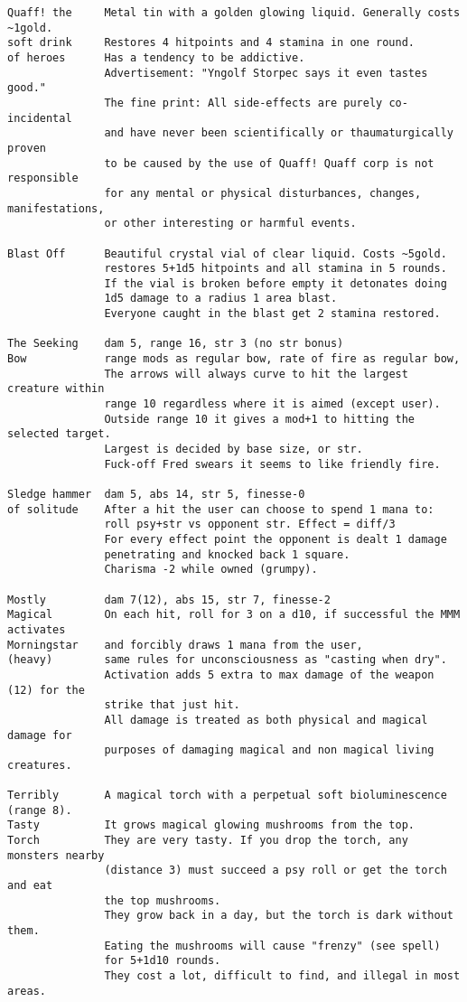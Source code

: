 \small \begin{verbatim}
Quaff! the     Metal tin with a golden glowing liquid. Generally costs ~1gold.
soft drink     Restores 4 hitpoints and 4 stamina in one round.
of heroes      Has a tendency to be addictive.
               Advertisement: "Yngolf Storpec says it even tastes good."
               The fine print: All side-effects are purely co-incidental
               and have never been scientifically or thaumaturgically proven
               to be caused by the use of Quaff! Quaff corp is not responsible
               for any mental or physical disturbances, changes, manifestations,
               or other interesting or harmful events.

Blast Off      Beautiful crystal vial of clear liquid. Costs ~5gold.
               restores 5+1d5 hitpoints and all stamina in 5 rounds.
               If the vial is broken before empty it detonates doing
               1d5 damage to a radius 1 area blast.
               Everyone caught in the blast get 2 stamina restored.

The Seeking    dam 5, range 16, str 3 (no str bonus)
Bow            range mods as regular bow, rate of fire as regular bow,
               The arrows will always curve to hit the largest creature within
               range 10 regardless where it is aimed (except user).
               Outside range 10 it gives a mod+1 to hitting the selected target.
               Largest is decided by base size, or str.
               Fuck-off Fred swears it seems to like friendly fire.

Sledge hammer  dam 5, abs 14, str 5, finesse-0
of solitude    After a hit the user can choose to spend 1 mana to:
               roll psy+str vs opponent str. Effect = diff/3
               For every effect point the opponent is dealt 1 damage
               penetrating and knocked back 1 square.
               Charisma -2 while owned (grumpy).

Mostly         dam 7(12), abs 15, str 7, finesse-2
Magical        On each hit, roll for 3 on a d10, if successful the MMM activates
Morningstar    and forcibly draws 1 mana from the user,
(heavy)        same rules for unconsciousness as "casting when dry".
               Activation adds 5 extra to max damage of the weapon (12) for the
               strike that just hit.
               All damage is treated as both physical and magical damage for
               purposes of damaging magical and non magical living creatures.

Terribly       A magical torch with a perpetual soft bioluminescence (range 8).
Tasty          It grows magical glowing mushrooms from the top.
Torch          They are very tasty. If you drop the torch, any monsters nearby
               (distance 3) must succeed a psy roll or get the torch and eat
               the top mushrooms.
               They grow back in a day, but the torch is dark without them.
               Eating the mushrooms will cause "frenzy" (see spell)
               for 5+1d10 rounds.
               They cost a lot, difficult to find, and illegal in most areas.


\end{verbatim}
